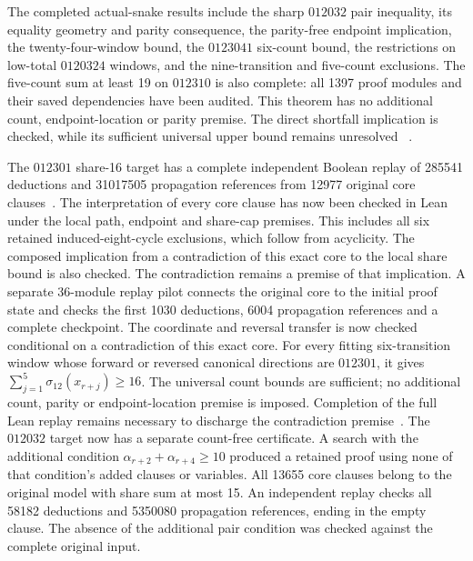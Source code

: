 \documentclass[11pt,a4paper]{article}
\theoremstyle{definition}
\theoremstyle{remark}
\begin{document}
The completed actual-snake results include the sharp $012032$ pair
inequality, its equality geometry and parity consequence, the parity-free
endpoint implication, the twenty-four-window bound, the $0123041$
six-count bound, the restrictions on low-total $0120324$ windows, and the
nine-transition and five-count exclusions. The five-count sum at least 19
on $012310$ is also complete: all 1397 proof modules and their saved
dependencies have been audited. This theorem has no additional count,
endpoint-location or parity premise. The direct shortfall implication is
checked, while its sufficient universal upper bound remains unresolved
~\cite{count24archive,fivecount140archive,share145archive}.

The $012301$ share-16 target has a complete independent Boolean replay of
285541 deductions and 31017505 propagation references from 12977 original
core clauses~\cite{share145archive}. The interpretation of every core clause
has now been checked in Lean under the local path, endpoint and share-cap
premises. This includes all six retained induced-eight-cycle exclusions,
which follow from acyclicity. The composed implication from a contradiction
of this exact core to the local share bound is also checked. The contradiction
remains a premise of that implication. A separate 36-module replay pilot
connects the original core to the initial proof state and checks the first
1030 deductions, 6004 propagation references and a complete checkpoint.
The coordinate and reversal transfer is now checked conditional on a
contradiction of this exact core. For every fitting six-transition window
whose forward or reversed canonical directions are $012301$, it gives
$\sum_{j=1}^{5}\sigma_{12}(x_{r+j})\ge16$. The universal count bounds are
sufficient; no additional count, parity or endpoint-location premise is
imposed. Completion of the full Lean replay remains necessary to discharge
the contradiction premise~\cite{semantics147archive,transfer148archive}.
The $012032$ target now has a separate count-free certificate. A search
with the additional condition $\alpha_{r+2}+\alpha_{r+4}\ge10$ produced
a retained proof using none of that condition's added clauses or variables.
All 13655 core clauses belong to the original model with share sum at most
15. An independent replay checks all 58182 deductions and 5350080
propagation references, ending in the empty clause. The absence of the
additional pair condition was checked against the complete original input.
\end{document}

